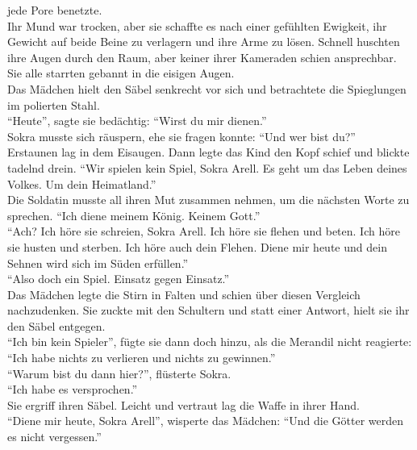 jede Pore benetzte.\\
Ihr Mund war trocken, aber sie schaffte es nach einer gefühlten Ewigkeit, ihr Gewicht auf beide 
Beine zu verlagern und ihre Arme zu lösen. Schnell huschten ihre Augen durch den Raum, aber keiner 
ihrer Kameraden schien ansprechbar. Sie alle starrten gebannt in die eisigen Augen.\\
Das Mädchen hielt den Säbel senkrecht vor sich und betrachtete die Spieglungen im polierten 
Stahl.\\
``Heute'', sagte sie bedächtig: ``Wirst du mir dienen.''\\
Sokra musste sich räuspern, ehe sie fragen konnte: ``Und wer bist du?''\\
Erstaunen lag in dem Eisaugen. Dann legte das Kind den Kopf schief und blickte tadelnd drein. ``Wir 
spielen kein Spiel, Sokra Arell. Es geht um das Leben deines Volkes. Um dein Heimatland.''\\
Die Soldatin musste all ihren Mut zusammen nehmen, um die nächsten Worte zu sprechen. ``Ich diene 
meinem König. Keinem Gott.''\\
``Ach? Ich höre sie schreien, Sokra Arell. Ich höre sie flehen und beten. Ich höre sie husten und 
sterben. Ich höre auch dein Flehen. Diene mir heute und dein Sehnen wird sich im Süden erfüllen.''\\
``Also doch ein Spiel. Einsatz gegen Einsatz.''\\
Das Mädchen legte die Stirn in Falten und schien über diesen Vergleich nachzudenken. Sie zuckte mit 
den Schultern und statt einer Antwort, hielt sie ihr den Säbel entgegen.\\
``Ich bin kein Spieler'', fügte sie dann doch hinzu, als die Merandil nicht reagierte: ``Ich habe nichts zu verlieren und nichts zu 
gewinnen.''\\
``Warum bist du dann hier?'', flüsterte Sokra.\\
``Ich habe es versprochen.''\\
Sie ergriff ihren Säbel. Leicht und vertraut lag die Waffe in ihrer Hand.\\
``Diene mir heute, Sokra Arell'', wisperte das Mädchen: ``Und die Götter werden es nicht 
vergessen.''

